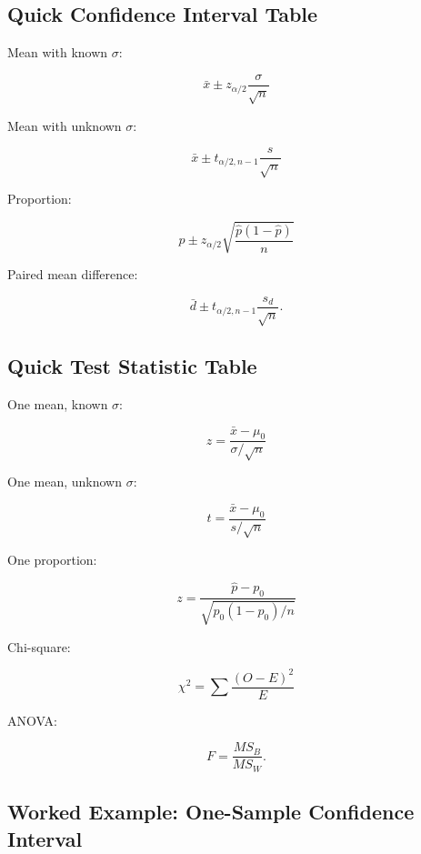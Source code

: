 \subsection{Quick Confidence Interval Table}
\label{subsec:quick-confidence-interval-table}

Mean with known \(\sigma\):

\[
\boxed{
\bar{x}
\pm
z_{\alpha/2}
\frac{\sigma}{\sqrt n}
}
\]

Mean with unknown \(\sigma\):

\[
\boxed{
\bar{x}
\pm
t_{\alpha/2,n-1}
\frac{s}{\sqrt n}
}
\]

Proportion:

\[
\boxed{
\hat p
\pm
z_{\alpha/2}
\sqrt{
\frac{
\hat p(1-\hat p)
}{
n
}
}
}
\]

Paired mean difference:

\[
\boxed{
\bar d
\pm
t_{\alpha/2,n-1}
\frac{s_d}{\sqrt n}.
}
\]

\subsection{Quick Test Statistic Table}
\label{subsec:quick-test-statistic-table}

One mean, known \(\sigma\):

\[
\boxed{
z
=
\frac{
\bar{x}-\mu_0
}{
\sigma/\sqrt n
}
}
\]

One mean, unknown \(\sigma\):

\[
\boxed{
t
=
\frac{
\bar{x}-\mu_0
}{
s/\sqrt n
}
}
\]

One proportion:

\[
\boxed{
z
=
\frac{
\hat p-p_0
}{
\sqrt{
p_0(1-p_0)/n
}
}
}
\]

Chi-square:

\[
\boxed{
\chi^2
=
\sum
\frac{
(O-E)^2
}{
E
}
}
\]

ANOVA:

\[
\boxed{
F
=
\frac{
MS_B
}{
MS_W
}.
}
\]

\subsection{Worked Example: One-Sample Confidence Interval}
\label{subsec:worked-one-sample-ci}

